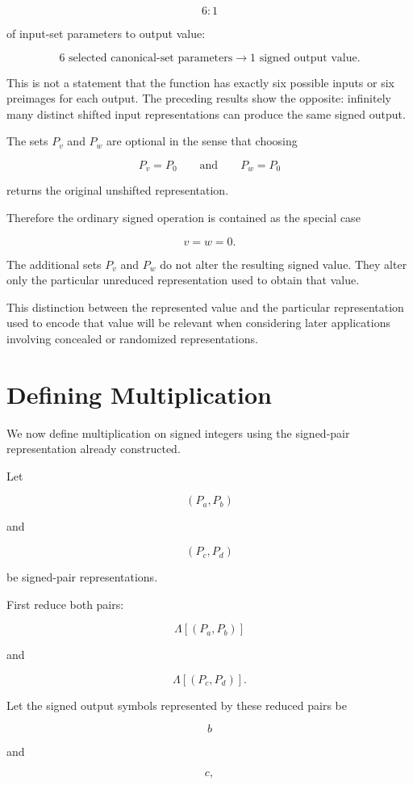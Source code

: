 \documentclass[12pt]{article}
\begin{document}
\[
\boxed{6:1}
\]

of input-set parameters to output value:

\[
\boxed{
6\text{ selected canonical-set parameters}
\longrightarrow
1\text{ signed output value}.
}
\]

This is not a statement that the function has exactly six possible inputs or six preimages for each output. The preceding results show the opposite: infinitely many distinct shifted input representations can produce the same signed output.

The sets \(P_v\) and \(P_w\) are optional in the sense that choosing

\[
P_v=P_0
\qquad\text{and}\qquad
P_w=P_0
\]

returns the original unshifted representation.

Therefore the ordinary signed operation is contained as the special case

\[
v=w=0.
\]

The additional sets \(P_v\) and \(P_w\) do not alter the resulting signed value. They alter only the particular unreduced representation used to obtain that value.

This distinction between the represented value and the particular representation used to encode that value will be relevant when considering later applications involving concealed or randomized representations.

\section*{Defining Multiplication}

We now define multiplication on signed integers using the signed-pair representation already constructed.

Let

\[
(P_a,P_b)
\]

and

\[
(P_c,P_d)
\]

be signed-pair representations.

First reduce both pairs:

\[
\Lambda[(P_a,P_b)]
\]

and

\[
\Lambda[(P_c,P_d)].
\]

Let the signed output symbols represented by these reduced pairs be

\[
b
\]

and

\[
c,
\]
\end{document}
